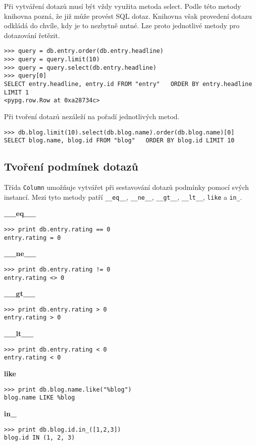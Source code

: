 \documentclass[11pt]{article}
\begin{document}
Při vytváření dotazů musí být vždy využita metoda select. Podle této metody knihovna pozná, že již může provést SQL dotaz. Knihovna však provedení dotazu odkládá do chvíle, kdy je to nezbytně nutné. Lze proto jednotlivé metody pro dotazování řetězit.

\begin{lstlisting}[style=python]
>>> query = db.entry.order(db.entry.headline)
>>> query = query.limit(10)
>>> query = query.select(db.entry.headline)
>>> query[0]
SELECT entry.headline, entry.id FROM "entry"   ORDER BY entry.headline LIMIT 1
<pypg.row.Row at 0xa28734c>
\end{lstlisting}

Při tvoření dotazů nezáleží na pořadí jednotlivých metod.

\begin{lstlisting}[style=python]
>>> db.blog.limit(10).select(db.blog.name).order(db.blog.name)[0]
SELECT blog.name, blog.id FROM "blog"   ORDER BY blog.id LIMIT 10
\end{lstlisting}

\subsection{Tvoření podmínek dotazů}

Třída \lstinline[style=inline]|Column| umožňuje vytvářet při sestavování dotazů podmínky pomocí svých instancí. Mezi tyto metody patří \lstinline[style=inline]|__eq__|, \lstinline[style=inline]|__ne__|, \lstinline[style=inline]|__gt__|, \lstinline[style=inline]|__lt__|, \lstinline[style=inline]|like| a \lstinline[style=inline]|in_|.

\textbf{\_\_eq\_\_}
\begin{lstlisting}[style=python]
>>> print db.entry.rating == 0
entry.rating = 0
\end{lstlisting}
\textbf{\_\_ne\_\_}
\begin{lstlisting}[style=python]
>>> print db.entry.rating != 0
entry.rating <> 0
\end{lstlisting}
\textbf{\_\_gt\_\_}
\begin{lstlisting}[style=python]
>>> print db.entry.rating > 0
entry.rating > 0
\end{lstlisting}
\textbf{\_\_lt\_\_}
\begin{lstlisting}[style=python]
>>> print db.entry.rating < 0
entry.rating < 0
\end{lstlisting}
\textbf{like}
\begin{lstlisting}[style=python]
>>> print db.blog.name.like("%blog")
blog.name LIKE %blog
\end{lstlisting}
\textbf{in\_}
\begin{lstlisting}[style=python]
>>> print db.blog.id.in_([1,2,3])
blog.id IN (1, 2, 3)
\end{lstlisting}
\end{document}
